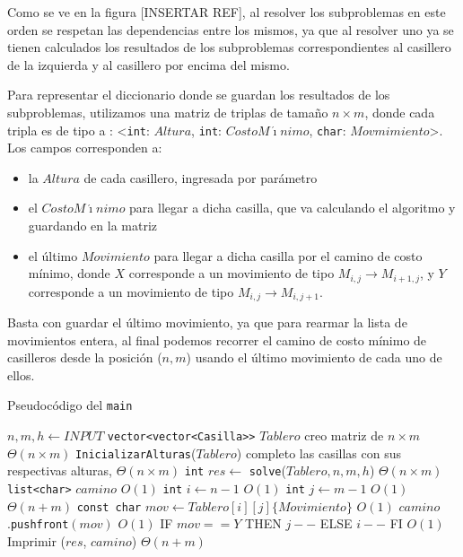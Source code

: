 
Como se ve en la figura [INSERTAR REF], al resolver los subproblemas en este orden 
se respetan las dependencias entre los mismos, ya que al resolver uno ya se tienen calculados los resultados de los subproblemas correspondientes al casillero de la izquierda y al casillero por encima del mismo.

Para representar el diccionario donde se guardan los resultados de los subproblemas, utilizamos una matriz de triplas de tamaño $n \times m$, donde cada tripla es de tipo a : <\texttt{int}: $Altura$, \texttt{int}: $CostoM\acute{\imath}nimo$, \texttt{char}: $Movmimiento$>. Los campos corresponden a:
\begin{itemize}
\item la $Altura$ de cada casillero, ingresada por parámetro
\item el $CostoM\acute{\imath}nimo$ para llegar a dicha casilla, que va calculando el algoritmo y guardando en la matriz
\item el último $Movimiento$ para llegar a dicha casilla por el camino de costo mínimo, donde $X$ corresponde a un movimiento de tipo $M_{i,j} \rightarrow M_{i+1,j}$, y $Y$ corresponde a un movimiento de tipo $M_{i,j} \rightarrow M_{i,j+1}$.
\end{itemize}
Basta con guardar el último movimiento, ya que para rearmar la lista de movimientos entera, al final podemos recorrer el camino de costo mínimo de casilleros desde la posición ($n,m$) usando el último movimiento de cada uno de ellos.

\begin{algorithm}[H]
  \begin{algorithmic}[1]
  \caption{Pseudocódigo del \texttt{main}}
  \label{algo:3-1}
 	\State $n, m, h \gets INPUT$
 	\State \texttt{vector<vector<Casilla>\null>} $Tablero$ 
 	\Comment creo matriz de $n \times m$
 	\Comment $\Theta(n\times m)$
 	\State \texttt{InicializarAlturas}($Tablero$) 
 	\Comment completo las casillas con sus respectivas alturas, $\Theta(n\times m)$
	\State \texttt{int} $res \gets$ \texttt{solve}($Tablero,n,m,h$)
	\Comment $\Theta(n\times m)$
	\State \texttt{list<char>} $camino$
	\Comment $O(1)$
	\State \texttt{int} $i \gets n-1$
	\Comment $O(1)$
	\State \texttt{int} $j \gets m-1$
	\Comment $O(1)$
	\Comment $\Theta(n+m)$
		\State \texttt{const char} $mov \gets Tablero[i][j]\{Movimiento\}$
		\Comment $O(1)$
		\State $camino$.\texttt{pushfront}$(mov)$
		\Comment $O(1)$
		\State IF $mov == Y$ THEN $j--$ ELSE $i--$ FI
		\Comment $O(1)$
	\EndWhile
	\State Imprimir ($res$, $camino$)
	\Comment $\Theta(n+m)$
    \EndProcedure
  \end{algorithmic}
\end{algorithm}

